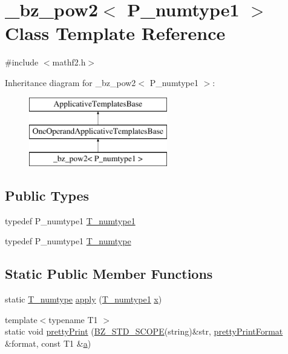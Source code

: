 \hypertarget{class__bz__pow2}{}\section{\+\_\+bz\+\_\+pow2$<$ P\+\_\+numtype1 $>$ Class Template Reference}
\label{class__bz__pow2}


{\ttfamily \#include $<$mathf2.\+h$>$}

Inheritance diagram for \+\_\+bz\+\_\+pow2$<$ P\+\_\+numtype1 $>$\+:\begin{figure}[H]
\begin{center}
\leavevmode
\includegraphics[height=3.000000cm]{class__bz__pow2}
\end{center}
\end{figure}
\subsection*{Public Types}
\begin{DoxyCompactItemize}
\item 
typedef P\+\_\+numtype1 \hyperlink{class__bz__pow2_ad1b4f3f838226a2de37514d57bab9388}{T\+\_\+numtype1}
\item 
typedef P\+\_\+numtype1 \hyperlink{class__bz__pow2_ac4dd6db8ed99fd2ba86ffe3c36b9d5a8}{T\+\_\+numtype}
\end{DoxyCompactItemize}
\subsection*{Static Public Member Functions}
\begin{DoxyCompactItemize}
\item 
static \hyperlink{class__bz__pow2_ac4dd6db8ed99fd2ba86ffe3c36b9d5a8}{T\+\_\+numtype} \hyperlink{class__bz__pow2_a48b7569d3c83cfe4d6d67f298861987b}{apply} (\hyperlink{class__bz__pow2_ad1b4f3f838226a2de37514d57bab9388}{T\+\_\+numtype1} \hyperlink{vecnorm1_8cc_ac73eed9e41ec09d58f112f06c2d6cb63}{x})
\item 
{\footnotesize template$<$typename T1 $>$ }\\static void \hyperlink{class__bz__pow2_a1ac7932cd1ee215862e6a6aaddcd8268}{pretty\+Print} (\hyperlink{numinquire_8h_a2b24ffc3b4ef9803956bc7715c6c7b83}{B\+Z\+\_\+\+S\+T\+D\+\_\+\+S\+C\+O\+P\+E}(string)\&str, \hyperlink{classprettyPrintFormat}{pretty\+Print\+Format} \&format, const T1 \&\hyperlink{gen__mat5files_8m_aae328bf20413f220e38aec4d95bfd6da}{a})
\end{DoxyCompactItemize}


